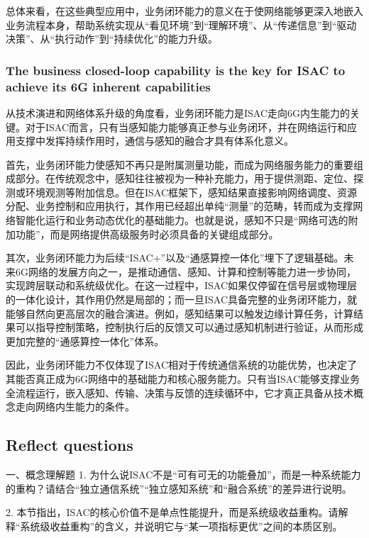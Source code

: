 总体来看，在这些典型应用中，业务闭环能力的意义在于使网络能够更深入地嵌入业务流程本身，帮助系统实现从“看见环境”到“理解环境”、从“传递信息”到“驱动决策”、从“执行动作”到“持续优化”的能力升级。

\subsubsection{The business closed-loop capability is the key for ISAC to achieve its 6G inherent capabilities}
\label{subsubsec:ch1-isac-core value-closed loop-6g}
从技术演进和网络体系升级的角度看，业务闭环能力是ISAC走向6G内生能力的关键。对于ISAC而言，只有当感知能力能够真正参与业务闭环，并在网络运行和应用支撑中发挥持续作用时，通信与感知的融合才具有体系化意义。

首先，业务闭环能力使感知不再只是附属测量功能，而成为网络服务能力的重要组成部分。在传统观念中，感知往往被视为一种补充能力，用于提供测距、定位、探测或环境观测等附加信息。但在ISAC框架下，感知结果直接影响网络调度、资源分配、业务控制和应用执行，其作用已经超出单纯“测量”的范畴，转而成为支撑网络智能化运行和业务动态优化的基础能力。也就是说，感知不只是“网络可选的附加功能”，而是网络提供高级服务时必须具备的关键组成部分。

其次，业务闭环能力为后续“ISAC+”以及“通感算控一体化”埋下了逻辑基础。未来6G网络的发展方向之一，是推动通信、感知、计算和控制等能力进一步协同，实现跨层联动和系统级优化。在这一过程中，ISAC如果仅停留在信号层或物理层的一体化设计，其作用仍然是局部的；而一旦ISAC具备完整的业务闭环能力，就能够自然向更高层次的融合演进。例如，感知结果可以触发边缘计算任务，计算结果可以指导控制策略，控制执行后的反馈又可以通过感知机制进行验证，从而形成更加完整的“通感算控一体化”体系。

因此，业务闭环能力不仅体现了ISAC相对于传统通信系统的功能优势，也决定了其能否真正成为6G网络中的基础能力和核心服务能力。只有当ISAC能够支撑业务全流程运行，嵌入感知、传输、决策与反馈的连续循环中，它才真正具备从技术概念走向网络内生能力的条件。

\subsection{Reflect questions}
\label{subsec:ch1.2-reflect-questions}
一、概念理解题
1. 为什么说ISAC不是“可有可无的功能叠加”，而是一种系统能力的重构？请结合“独立通信系统”“独立感知系统”和“融合系统”的差异进行说明。

2. 本节指出，ISAC的核心价值不是单点性能提升，而是系统级收益重构。请解释“系统级收益重构”的含义，并说明它与“某一项指标更优”之间的本质区别。

